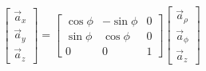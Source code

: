             \begin{equation}
                \begin{bmatrix}
                    \vec{a}_x \\ \vec{a}_y \\ \vec{a}_z
                \end{bmatrix} = 
                \begin{bmatrix}
                    \cos\phi & -\sin\phi & 0 \\
                    \sin\phi & \cos\phi & 0 \\
                    0 & 0 & 1
                \end{bmatrix}
                \begin{bmatrix}
                    \vec{a}_\rho \\
                    \vec{a}_\phi \\
                    \vec{a}_z
                \end{bmatrix}
            \end{equation}